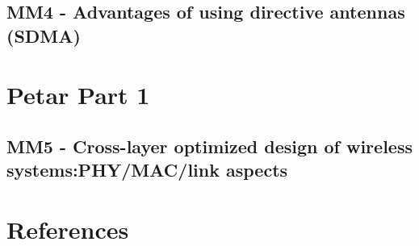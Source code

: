 \chapter{MM4 - Advantages of using directive antennas (SDMA)}





\part{Petar Part 1}
\chapter{MM5 - Cross-layer optimized design of wireless systems:PHY/MAC/link aspects}






\part{References}






